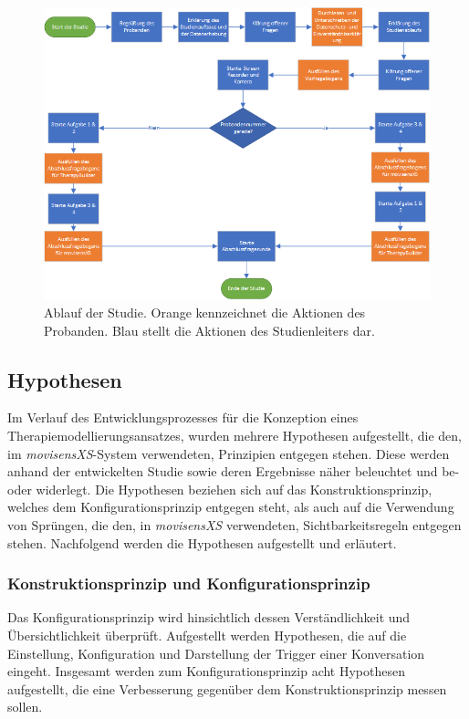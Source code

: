 \begin{figure}[h]
\centering
\includegraphics[width=1\textwidth]{pictures/diagramme/studienablauf-diagramm}
\caption{Ablauf der Studie. Orange kennzeichnet die Aktionen des Probanden. Blau stellt die Aktionen des Studienleiters dar.}
\label{studienablauf}
\end{figure}


\subsection{Hypothesen}
Im Verlauf des Entwicklungsprozesses für die Konzeption eines Therapiemodellierungsansatzes, wurden mehrere Hypothesen aufgestellt, die den, im \emph{movisensXS}-System verwendeten, Prinzipien entgegen stehen. Diese werden anhand der entwickelten Studie sowie deren Ergebnisse näher beleuchtet und be- oder widerlegt. Die Hypothesen beziehen sich auf das Konstruktionsprinzip, welches dem Konfigurationsprinzip entgegen steht, als auch auf die Verwendung von Sprüngen, die den, in \emph{movisensXS} verwendeten, Sichtbarkeitsregeln entgegen stehen. Nachfolgend werden die Hypothesen aufgestellt und erläutert.

\subsubsection{Konstruktionsprinzip und Konfigurationsprinzip}

Das Konfigurationsprinzip wird hinsichtlich dessen Verständlichkeit und Übersichtlichkeit überprüft. Aufgestellt werden Hypothesen, die auf die Einstellung, Konfiguration und Darstellung der Trigger einer Konversation eingeht. Insgesamt werden zum Konfigurationsprinzip acht Hypothesen aufgestellt, die eine Verbesserung gegenüber dem Konstruktionsprinzip messen sollen.

